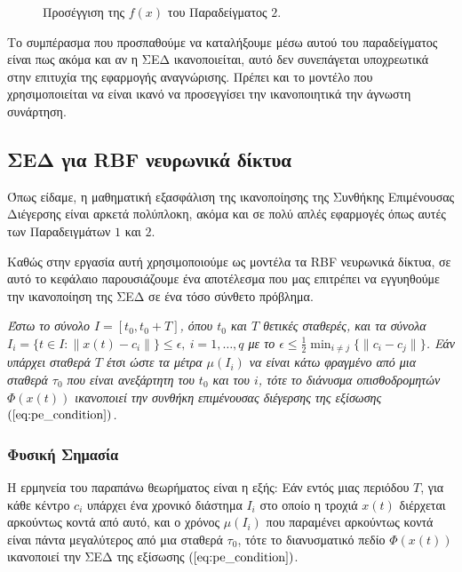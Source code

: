\begin{figure}[h!]
\centering

\caption{ Προσέγγιση της $f(x)$ του Παραδείγματος $2$. }
\label{fig:sines_approximation}
\end{figure}

\pagebreak
Το συμπέρασμα που προσπαθούμε να καταλήξουμε μέσω αυτού του παραδείγματος είναι πως ακόμα και αν η ΣΕΔ ικανοποιείται, αυτό δεν συνεπάγεται υποχρεωτικά στην επιτυχία της εφαρμογής αναγνώρισης. Πρέπει και το μοντέλο που χρησιμοποιείται να είναι ικανό να προσεγγίσει την ικανοποιητικά την άγνωστη συνάρτηση.

\subsection{ΣΕΔ για RBF νευρωνικά δίκτυα} \label{subsec:rbf_PE}
Όπως είδαμε, η μαθηματική εξασφάλιση της ικανοποίησης της Συνθήκης Επιμένουσας Διέγερσης είναι αρκετά πολύπλοκη, ακόμα και σε πολύ απλές εφαρμογές όπως αυτές των Παραδειγμάτων $1$ και $2$. 

Καθώς στην εργασία αυτή χρησιμοποιούμε ως μοντέλα τα RBF νευρωνικά δίκτυα, σε αυτό το κεφάλαιο παρουσιάζουμε ένα αποτέλεσμα που μας επιτρέπει να εγγυηθούμε την ικανοποίηση της ΣΕΔ σε ένα τόσο σύνθετο πρόβλημα.\\

\begin{theorem} 
\textit{Έστω το σύνολο $I = [t_0, t_0 + T]$, όπου $t_0$ και $T$
θετικές σταθερές, και τα σύνολα $I_i = \{ t \in I :  \| x(t) - c_i \| \} \leq \epsilon, \: i = 1,\dots, q $ με το $\epsilon \leq \frac{1}{2} \min_{i \neq j} \{\| c_i - c_j \| \}$. Εάν υπάρχει σταθερά $T$ έτσι ώστε τα μέτρα $\mu(I_i)$ να είναι κάτω φραγμένο από μια σταθερά $\tau_0$ που είναι ανεξάρτητη του $t_0$ και του $i$, τότε το διάνυσμα οπισθοδρομητών $\varPhi(x(t))$ ικανοποιεί την συνθήκη επιμένουσας διέγερσης της εξίσωσης $(\ref{eq:pe_condition})$.}
\end{theorem}

\subsubsection{Φυσική Σημασία}
Η ερμηνεία του παραπάνω θεωρήματος είναι η εξής: Εάν εντός μιας περιόδου $T$, για κάθε κέντρο $c_i$ υπάρχει ένα χρονικό διάστημα $I_i$ στο οποίο η τροχιά $x(t)$ διέρχεται αρκούντως κοντά από αυτό, και ο χρόνος $\mu (I_i)$ που παραμένει αρκούντως κοντά είναι πάντα μεγαλύτερος από μια σταθερά $\tau_0$, τότε το διανυσματικό πεδίο $\varPhi(x(t))$ ικανοποιεί την ΣΕΔ της εξίσωσης $(\ref{eq:pe_condition})$.

